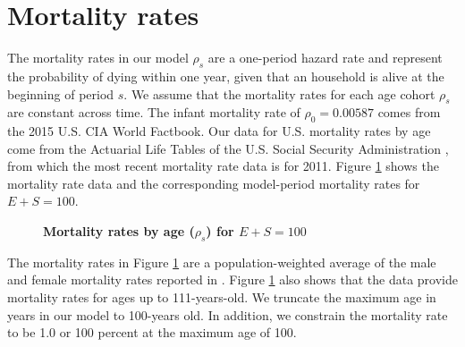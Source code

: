 \section{Mortality rates}\label{SecDemogMort}

  The mortality rates in our model $\rho_s$ are a one-period hazard rate and represent the probability of dying within one year, given that an household is alive at the beginning of period $s$. We assume that the mortality rates for each age cohort $\rho_s$ are constant across time. The infant mortality rate of $\rho_0=0.00587$ comes from the 2015 U.S. CIA World Factbook. Our data for U.S. mortality rates by age come from the Actuarial Life Tables of the U.S. Social Security Administration \citep[see][]{SocSec:2015}, from which the most recent mortality rate data is for 2011. Figure \ref{FigMortRates} shows the mortality rate data and the corresponding model-period mortality rates for $E+S=100$.

  \begin{figure}[htbp]\centering \captionsetup{width=4.0in}
    \caption{\label{FigMortRates}\textbf{Mortality rates by age ($\rho_s$) for $E+S=100$}}
  \end{figure}

  The mortality rates in Figure \ref{FigMortRates} are a population-weighted average of the male and female mortality rates reported in \citet{SocSec:2015}. Figure \ref{FigMortRates} also shows that the data provide mortality rates for ages up to 111-years-old. We truncate the maximum age in years in our model to 100-years old. In addition, we constrain the mortality rate to be 1.0 or 100 percent at the maximum age of 100.


